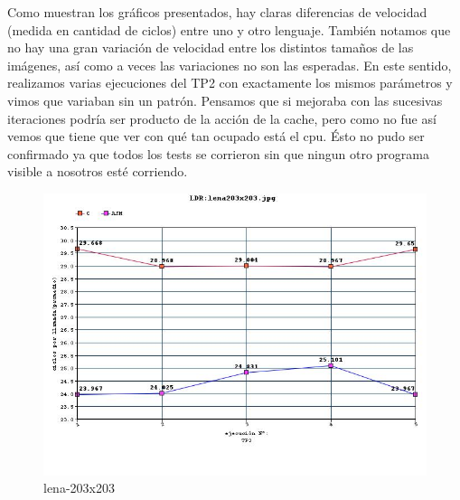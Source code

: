 Como muestran los gr\'aficos presentados, hay claras diferencias de velocidad (medida en cantidad de ciclos) entre uno y otro lenguaje. Tambi\'en notamos que no hay una gran 
variaci\'on de velocidad entre los distintos tamaños de las im\'agenes, as\'i como a veces las variaciones no son las esperadas. En este sentido, realizamos varias ejecuciones 
del TP2 con exactamente los mismos par\'ametros y vimos que variaban sin un patr\'on. Pensamos que si mejoraba con las sucesivas iteraciones podr\'ia ser 
producto de la acci\'on de la cache, pero como no fue as\'i vemos que tiene que ver con qu\'e tan ocupado est\'a el cpu. \'Esto no pudo ser confirmado ya que todos 
los tests se corrieron sin que ningun otro programa visible a nosotros est\'e corriendo.
\begin{figure}
  \begin{center}
	\includegraphics[scale=0.66]{imagenes/ldr-lena-203.jpg}
	\caption{lena-203x203}
	\label{lena-203x203}
  \end{center}
\end{figure}
